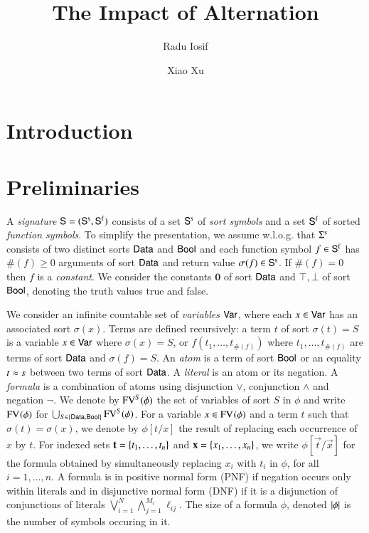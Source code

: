 \documentclass{llncs}
\begin{document}

\title{The Impact of Alternation}

\author{Radu Iosif \and Xiao Xu}


\maketitle

\begin{abstract}
\end{abstract}

\section{Introduction}

\section{Preliminaries}

A \emph{signature} $\mathsf{S} = (\mathsf{S}^\mathrm{s},\mathsf{S}^\mathrm{f})$ consists of a
set $\mathsf{S}^\mathrm{s}$ of \emph{sort symbols} and a set $\mathsf{S}^\mathrm{f}$ of
sorted \emph{function symbols}. To simplify the presentation, we
assume w.l.o.g. that $\Sigma^\mathrm{s}$ consists of two distinct sorts
$\mathsf{Data}$ and $\mathsf{Bool}$ and each function symbol $f \in \mathsf{S}^\mathrm{f}$ has
$\#(f) \geq 0$ arguments of sort $\mathsf{Data}$ and return value $\sigma(f)
\in \mathsf{S}^\mathrm{s}$. If $\#(f)=0$ then $f$ is a \emph{constant}. We
consider the constants $\mathbf{0}$ of sort $\mathsf{Data}$ and $\top,\bot$ of
sort $\mathsf{Bool}$, denoting the truth values true and false.

We consider an infinite countable set of \emph{variables} $\mathsf{Var}$,
where each $x \in \mathsf{Var}$ has an associated sort $\sigma(x)$. Terms are
defined recursively: a term $t$ of sort $\sigma(t)=S$ is a variable $x
\in \mathsf{Var}$ where $\sigma(x)=S$, or $f(t_1,\ldots,t_{\#(f)})$ where
$t_1,\ldots,t_{\#(f)}$ are terms of sort $\mathsf{Data}$ and $\sigma(f)=S$. An
\emph{atom} is a term of sort $\mathsf{Bool}$ or an equality $t \approx s$
between two terms of sort $\mathsf{Data}$. A \emph{literal} is an atom or its
negation. A \emph{formula} is a combination of atoms using disjunction
$\vee$, conjunction $\wedge$ and negation $\neg$. We denote by
$\mathrm{FV}^{S}(\phi)$ the set of variables of sort $S$ in $\phi$ and write
$\mathrm{FV}^{}(\phi)$ for $\bigcup_{S \in \left\{ \mathsf{Data},\mathsf{Bool} \right\}}
\mathrm{FV}^{S}(\phi)$. For a variable $x \in \mathrm{FV}^{}(\phi)$ and a term $t$ such
that $\sigma(t) = \sigma(x)$, we denote by $\phi[t/x]$ the result of
replacing each occurrence of $x$ by $t$. For indexed sets
$\mathbf t=\left\{ t_1,\ldots,t_n \right\}$ and $\mathbf x=\left\{ x_1,\ldots,x_n \right\}$, we
write $\phi[\vec{t}/\vec{x}]$ for the formula obtained by
simultaneously replacing $x_i$ with $t_i$ in $\phi$, for all
$i=1,\ldots,n$. A formula is in positive normal form (PNF) if negation
occurs only within literals and in disjunctive normal form (DNF) if it
is a disjunction of conjunctions of literals $\bigvee_{i=1}^N
\bigwedge_{j=1}^{M_i} \ell_{ij}$. The size of a formula $\phi$,
denoted ${|{\phi}|}$ is the number of symbols occuring in it.
\end{document}

